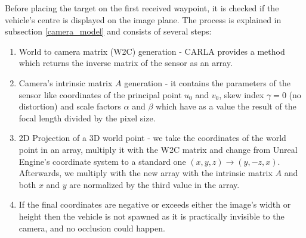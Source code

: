 Before placing the target on the first received waypoint, it is checked if the vehicle's centre is displayed on the image plane. The process is explained in subsection \ref{camera_model} and consists of several steps:
\begin{enumerate}
    \item World to camera matrix (W2C) generation - CARLA provides a method which returns the inverse matrix of the sensor as an array.
    \item Camera's intrinsic matrix $A$ generation - it contains the parameters of the sensor like coordinates of the principal point $u_0$ and $v_0$, skew index $\gamma=0$ (no distortion) and scale factors $\alpha$ and $\beta$ which have as a value the result of the focal length divided by the pixel size.
    \item 2D Projection of a 3D world point - we take the coordinates of the world point in an array, multiply it with the W2C matrix and change from Unreal Engine's coordinate system to a standard one $(x, y ,z) \rightarrow (y, -z, x)$. Afterwards, we multiply with the new array with the intrinsic matrix $A$ and both $x$ and $y$ are normalized by the third value in the array.
    \item If the final coordinates are negative or exceeds either the image's width or height then the vehicle is not spawned as it is practically invisible to the camera, and no occlusion could happen.
\end{enumerate}

